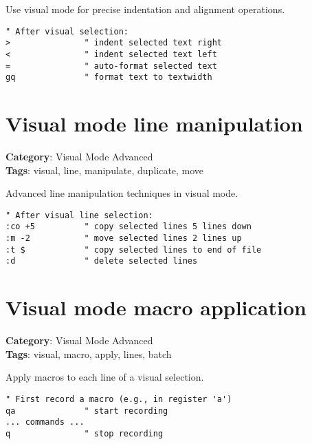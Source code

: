 {{{{{{{{{{{{{{{{{{Use visual mode for precise indentation and alignment operations.

\begin{Exa*}{}
\begin{Verbatim}[fontsize=\footnotesize, breaklines, breakanywhere]
" After visual selection:
>               " indent selected text right
<               " indent selected text left  
=               " auto-format selected text
gq              " format text to textwidth
\end{Verbatim}
\end{Exa*}

\section{Visual mode line manipulation}

\textbf{Category}: Visual Mode Advanced\\ \textbf{Tags}: visual, line, manipulate, duplicate, move
\vspace{0.5cm}

Advanced line manipulation techniques in visual mode.

\begin{Exa*}{}
\begin{Verbatim}[fontsize=\footnotesize, breaklines, breakanywhere]
" After visual line selection:
:co +5          " copy selected lines 5 lines down
:m -2           " move selected lines 2 lines up  
:t $            " copy selected lines to end of file
:d              " delete selected lines
\end{Verbatim}
\end{Exa*}

\section{Visual mode macro application}

\textbf{Category}: Visual Mode Advanced\\ \textbf{Tags}: visual, macro, apply, lines, batch
\vspace{0.5cm}

Apply macros to each line of a visual selection.

\begin{Exa*}{}
\begin{Verbatim}[fontsize=\footnotesize, breaklines, breakanywhere]
" First record a macro (e.g., in register 'a')
qa              " start recording
... commands ...
q               " stop recording


\end{Verbatim}
\end{Exa*}}}}}}}}}}}}}}}}}}}
